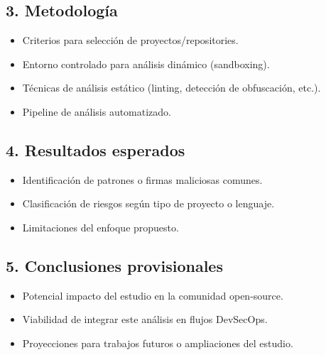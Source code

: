 \documentclass[12pt,a4paper]{article}
\begin{document}
\subsection*{3. Metodología}
\begin{itemize}[label=--]
    \item Criterios para selección de proyectos/repositories.
    \item Entorno controlado para análisis dinámico (sandboxing).
    \item Técnicas de análisis estático (linting, detección de obfuscación, etc.).
    \item Pipeline de análisis automatizado.
\end{itemize}

\subsection*{4. Resultados esperados}
\begin{itemize}[label=--]
    \item Identificación de patrones o firmas maliciosas comunes.
    \item Clasificación de riesgos según tipo de proyecto o lenguaje.
    \item Limitaciones del enfoque propuesto.
\end{itemize}

\subsection*{5. Conclusiones provisionales}
\begin{itemize}[label=--]
    \item Potencial impacto del estudio en la comunidad open-source.
    \item Viabilidad de integrar este análisis en flujos DevSecOps.
    \item Proyecciones para trabajos futuros o ampliaciones del estudio.
\end{itemize}
\end{document}
